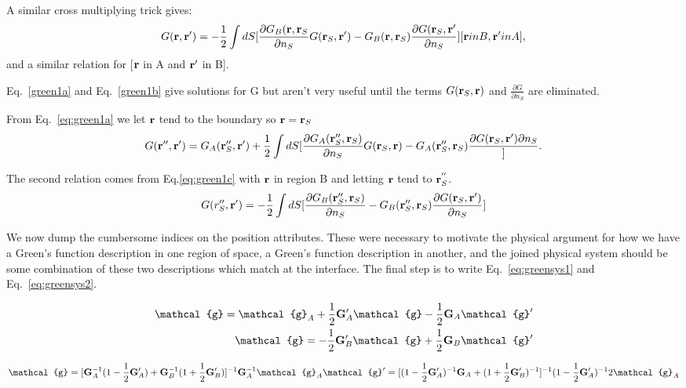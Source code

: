 \documentclass{article}
\def\G{{\bf G}}
\def\r{{\bf r}}
\def\g{\mathcal{g}}
\begin{document}
A similar cross multiplying trick gives:
%
\begin{equation}
\label{eq:green1c}
G(\r,\r') = -\frac{1}{2} \int dS[\frac{\partial G_{B}(\r, \r_{S}}{\partial n_{S}} G(\r_{S},\r')
- G_{B}(\r, \r_{S})\frac{\partial G(\r_{S},\r'}{\partial n_{S}}] [\r in B, \r' in A],
\end{equation}
%
and a similar relation for [$\r$ in A and $\r'$ in B].

Eq.~\ref{green1a} and Eq.~\ref{green1b} give solutions for G but 
aren't very useful until the terms
$G(\r_S,\r)$ and $\frac{\partial G}{\partial n_{S}}$ are eliminated.

From Eq.~\ref{eq:green1a} we let $\r$ tend to the boundary so $\r = \r_{S}$
%
\begin{equation}
\label{eq:greensys1}
G(\r'',\r') = G_{A}(\r''_{S}, \r') + \frac{1}{2} \int d{S}
[\frac{\partial G_{A}(\r''_{S}, \r_{S})}{\partial n_{S}} G(\r_{S},\r) - 
G_{A}(\r''_{S},\r_{S})\frac{\partial{G(\r_{S}, \r')}{\partial n_{S}}}].
\end{equation}
%

The second relation comes from Eq.\ref{eq:green1c} with 
$\r$ in region B and letting $\r$ tend to $\r^{''}_{S}$.
%
\begin{equation}
\label{eq:greensys2}
G(r''_{S}, \r') = -\frac{1}{2}\int dS [\frac{\partial G_{B}(\r''_{S}, \r_{S})}{\partial n_{S}}
-G_{B}(\r''_{S},\r_{S})\frac{\partial G(\r_{S},\r')}{\partial n_{S}}]
\end{equation}
%

We now dump the cumbersome indices on the position attributes. These
were necessary to motivate the physical argument for how we have a Green's function
description in one region of space, a Green's function description in another, 
and the joined physical system should be some combination of these two descriptions
which match at the interface. The final step is to write Eq.~\ref{eq:greensys1} 
and Eq.~\ref{eq:greensys2}.


\begin{eqnarray}
\label{eq:operator1}
\g = \g_{A} + \frac{1}{2}\G'_{A}\g - \frac{1}{2}\G_{A}\g' \\
\g = -\frac{1}{2}\G'_{B}\g + \frac{1}{2}\G_{B}\g' \\
\end{eqnarray}

\begin{eqnarray}
\label{eq:operator2}
\g = [\G^{-1}_{A}(1-\frac{1}{2}\G'_{A}) + \G^{-1}_{B}(1+\frac{1}{2}\G'_{B})]^{-1} \G^{-1}_{A}\g_{A}
\g'= [(1-\frac{1}{2}\G'_{A})^{-1}\G_{A} + (1+\frac{1}{2}\G'_{B})^{-1}]^{-1}(1 - \frac{1}{2}\G'_{A})^{-1}2\g_{A}
\end{eqnarray}
\end{document}
